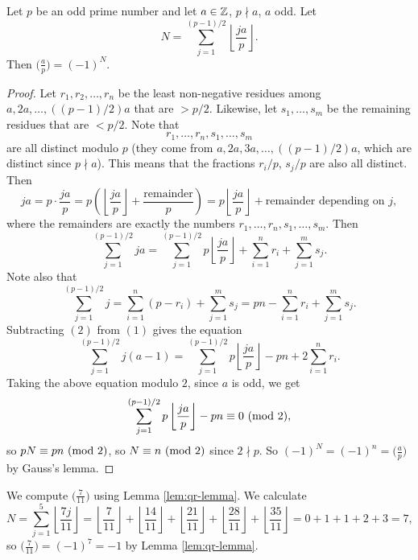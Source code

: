 \begin{lemma}\label{lem:qr-lemma}
  Let $p$ be an odd prime number and
  let $a \in \mathbb{Z}$, $p \nmid a$, $a$ odd.
  Let
  \[
    N = \sum_{j = 1}^{(p - 1) / 2}
    \left\lfloor \frac{ja}{p} \right\rfloor.
  \]
  Then $\big(\frac{a}{p}\big) = (-1)^N$.
\end{lemma}

\begin{proof}
  Let $r_1, r_2, \dots, r_n$ be the least
  non-negative residues among
  $a, 2a, \dots, ((p - 1) / 2) a$
  that are $> p / 2$. Likewise, let
  $s_1, \dots, s_m$ be the remaining
  residues that are $< p / 2$. Note that
  \[
    r_1, \dots, r_n, s_1, \dots, s_m
  \]
  are all distinct modulo $p$ (they come
  from $a, 2a, 3a, \dots , ((p - 1) / 2)a$,
  which are distinct since $p \nmid a$).
  This means that the fractions
  $r_i / p$, $s_j / p$  are also all
  distinct. Then
  \[
    ja
    = p \cdot \frac{ja}{p}
    = p \left(\left\lfloor \frac{ja}{p} \right\rfloor + \frac{\text{remainder}}{p}\right)
    = p \left\lfloor \frac{ja}{p} \right\rfloor + \text{remainder depending on $j$},
  \]
  where the remainders are exactly the
  numbers $r_1, \dots, r_n, s_1, \dots, s_m$.
  Then
  \[
    \sum_{j = 1}^{(p - 1) / 2} ja
    = \sum_{j = 1}^{(p - 1) / 2}
    p \left\lfloor \frac{ja}{p} \right\rfloor
    + \sum_{i = 1}^n r_i + \sum_{j = 1}^m s_j.
    \tag{$1$}
  \]
  Note also that
  \[
    \sum_{j = 1}^{(p - 1) / 2} j
    = \sum_{i = 1}^n (p - r_i) + \sum_{j = 1}^m s_j
    = pn - \sum_{i = 1}^n r_i + \sum_{j = 1}^m s_j.
    \tag{$2$}
  \]
  Subtracting $(2)$ from $(1)$ gives the
  equation
  \[
    \sum_{j = 1}^{(p - 1) / 2} j(a - 1)
    = \sum_{j = 1}^{(p - 1) / 2}
    p \left\lfloor \frac{ja}{p} \right\rfloor
    - pn + 2\sum_{i = 1}^n r_i.
  \]
  Taking the above equation modulo $2$,
  since $a$ is odd, we get
  \[
    \sum_{j = 1}^{(p - 1) / 2} p \left\lfloor \frac{ja}{p} \right\rfloor
    - pn \equiv 0 \ (\mathrm{mod}\ 2),
  \]
  so $pN \equiv pn \ (\mathrm{mod}\ 2)$,
  so $N \equiv n \ (\mathrm{mod}\ 2)$
  since $2 \nmid p$.
  So $(-1)^N = (-1)^n = \big(\frac{a}{p}\big)$
  by Gauss's lemma.
\end{proof}

\begin{example}
  We compute $\big(\frac{7}{11}\big)$
  using Lemma \ref{lem:qr-lemma}.
  We calculate
  \[
    N = \sum_{j = 1}^5 \left\lfloor \frac{7j}{11} \right\rfloor
    = \left\lfloor \frac{7}{11} \right\rfloor
    + \left\lfloor \frac{14}{11} \right\rfloor
    + \left\lfloor \frac{21}{11} \right\rfloor
    + \left\lfloor \frac{28}{11} \right\rfloor
    + \left\lfloor \frac{35}{11} \right\rfloor
    = 0 + 1 + 1 + 2 + 3 = 7,
  \]
  so $\big(\frac{7}{11}\big) = (-1)^7 = -1$
  by Lemma \ref{lem:qr-lemma}.
\end{example}
